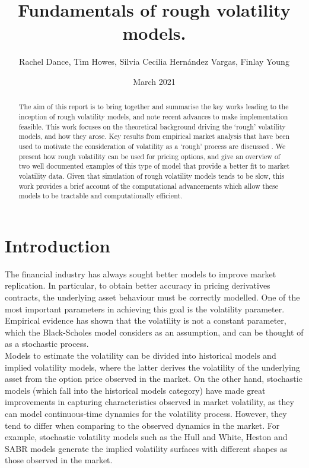 \documentclass[12pt,oneside]{article}
\title{Fundamentals of rough volatility models.}
\date{March 2021}
\author{Rachel Dance, Tim Howes, Silvia Cecilia Hernández Vargas, Finlay Young}
\begin{document}
  \maketitle

  \begin{abstract}The aim of this report is to bring together and summarise the key works leading to the inception of rough volatility models, and note recent advances to make implementation feasible. This work focuses on the theoretical background driving the `rough' volatility models, and how they arose. Key results from empirical market analysis that have been used to motivate the consideration of volatility as a `rough' process are discussed \cite{Gatheral2014}. We present how rough volatility can be used for pricing options, and give an overview of two well documented examples of this type of model that provide a better fit to market volatility data. Given that simulation of rough volatility models tends to be slow, this work provides a brief account of the computational advancements which allow these models to be tractable and computationally efficient.
  \end{abstract}

  \tableofcontents
 \newpage

\section{Introduction}
The financial industry has always sought better models to improve market replication. In particular, to obtain better accuracy in pricing derivatives contracts, the underlying asset behaviour must be correctly modelled. One of the most important parameters in achieving this goal is the volatility parameter. Empirical evidence has shown that the volatility is not a constant parameter, which the Black-Scholes model considers as an assumption, and can be thought of as a stochastic process.
\\

Models to estimate the volatility can be divided into historical models and implied volatility models, where the latter derives the volatility of the underlying asset from the option price observed in the market. On the other hand, stochastic models (which fall into the historical models category) have made great improvements in capturing characteristics observed in market volatility, as they can model continuous-time dynamics for the volatility process. However, they tend to differ when comparing to the observed dynamics in the market. For example, stochastic volatility models such as the Hull and White, Heston and SABR models generate the implied volatility surfaces with different shapes as those observed in the market. 
\\
\end{document}
